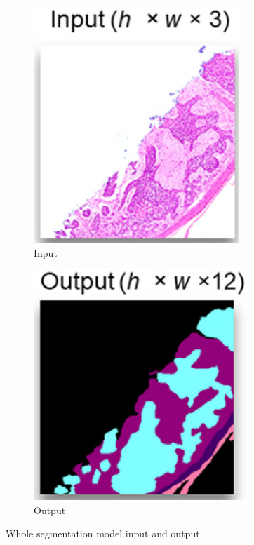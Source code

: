 \begin{figure}[h]
\centering
    \begin{subfigure}[b]{0.3\textwidth}
        \centering
        \includegraphics[scale=.5]{./chapter-03-state-of-the-art/seg-input.png}
        \caption{Input}
        \label{fig:seg-input}
    \end{subfigure}
    \begin{subfigure}[b]{0.3\textwidth}
        \centering
        \includegraphics[scale=.5]{./chapter-03-state-of-the-art/seg-output.png}
        \caption{Output}
        \label{fig:seg-output}
    \end{subfigure}
\caption{Whole segmentation model input and output}
\label{fig:seg-input-output}
\end{figure}






